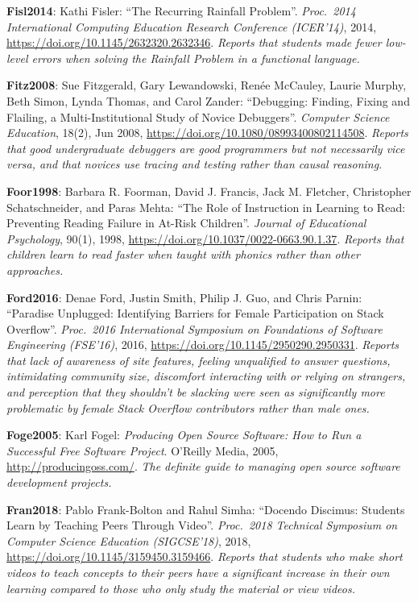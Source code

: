 \textbf{\hypertarget{b:Fisl2014}{Fisl2014}\label{b:Fisl2014}}: Kathi Fisler: ``The Recurring Rainfall Problem''. \emph{Proc.\ 2014 International Computing Education Research Conference (ICER'14)}, 2014, \url{https://doi.org/10.1145/2632320.2632346}. \emph{Reports that students made fewer low-level errors when solving the Rainfall Problem in a functional language.}

\textbf{\hypertarget{b:Fitz2008}{Fitz2008}\label{b:Fitz2008}}: Sue Fitzgerald, Gary Lewandowski, Renée McCauley, Laurie Murphy, Beth Simon, Lynda Thomas, and Carol Zander: ``Debugging: Finding, Fixing and Flailing, a Multi-Institutional Study of Novice Debuggers''. \emph{Computer Science Education}, 18(2), Jun 2008, \url{https://doi.org/10.1080/08993400802114508}. \emph{Reports that good undergraduate debuggers are good programmers but not necessarily vice versa, and that novices use tracing and testing rather than causal reasoning.}

\textbf{\hypertarget{b:Foor1998}{Foor1998}\label{b:Foor1998}}: Barbara R. Foorman, David J. Francis, Jack M. Fletcher, Christopher Schatschneider, and Paras Mehta: ``The Role of Instruction in Learning to Read: Preventing Reading Failure in At-Risk Children''. \emph{Journal of Educational Psychology}, 90(1), 1998, \url{https://doi.org/10.1037/0022-0663.90.1.37}. \emph{Reports that children learn to read faster when taught with phonics rather than other approaches.}

\textbf{\hypertarget{b:Ford2016}{Ford2016}\label{b:Ford2016}}: Denae Ford, Justin Smith, Philip J. Guo, and Chris Parnin: ``Paradise Unplugged: Identifying Barriers for Female Participation on Stack Overflow''. \emph{Proc.\ 2016 International Symposium on Foundations of Software Engineering (FSE'16)}, 2016, \url{https://doi.org/10.1145/2950290.2950331}. \emph{Reports that lack of awareness of site features, feeling unqualified to answer questions, intimidating community size, discomfort interacting with or relying on strangers, and perception that they shouldn't be slacking were seen as significantly more problematic by female Stack Overflow contributors rather than male ones.}

\textbf{\hypertarget{b:Foge2005}{Foge2005}\label{b:Foge2005}}: Karl Fogel: \emph{Producing Open Source Software: How to Run a Successful Free Software Project}. O'Reilly Media, 2005, \url{http://producingoss.com/}. \emph{The definite guide to managing open source software development projects.}

\textbf{\hypertarget{b:Fran2018}{Fran2018}\label{b:Fran2018}}: Pablo Frank-Bolton and Rahul Simha: ``Docendo Discimus: Students Learn by Teaching Peers Through Video''. \emph{Proc.\ 2018 Technical Symposium on Computer Science Education (SIGCSE'18)}, 2018, \url{https://doi.org/10.1145/3159450.3159466}. \emph{Reports that students who make short videos to teach concepts to their peers have a significant increase in their own learning compared to those who only study the material or view videos.}

